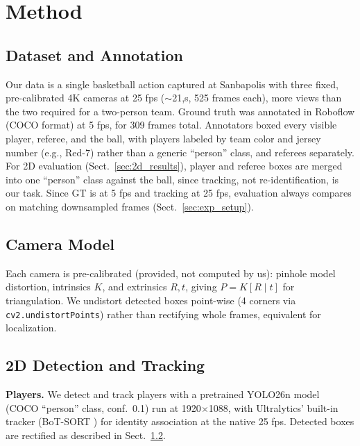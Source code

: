 \documentclass[runningheads]{llncs}
\begin{document}
\section{Method}
\label{sec:method}

\subsection{Dataset and Annotation}
\label{sec:dataset}

Our data is a single basketball action captured at Sanbapolis with three fixed, pre-calibrated 4K cameras at 25 fps ($\sim$21,s, 525 frames each), more views than the two required for a two-person team. Ground truth was annotated in Roboflow (COCO format) at 5 fps, for 309 frames total. Annotators boxed every visible player, referee, and the ball, with players labeled by team color and jersey number (e.g., Red-7) rather than a generic ``person'' class, and referees separately. For 2D evaluation (Sect.~\ref{sec:2d_results}), player and referee boxes are merged into one ``person'' class against the ball, since tracking, not re-identification, is our task. Since GT is at 5 fps and tracking at 25 fps, evaluation always compares on matching downsampled frames (Sect.~\ref{sec:exp_setup}).


\subsection{Camera Model}
\label{sec:calibration}

Each camera is pre-calibrated (provided, not computed by us): pinhole model distortion, intrinsics $K$, and extrinsics $R,t$, giving $P=K[R\mid t]$ for triangulation. We undistort detected boxes point-wise (4 corners via \texttt{cv2.undistortPoints}) rather than rectifying whole frames, equivalent for localization.

\subsection{2D Detection and Tracking}
\label{sec:2d_tracking}

\textbf{Players.} We detect and track players with a pretrained YOLO26n model \cite{Jocher2023} (COCO ``person'' class, conf.\ 0.1) run at 1920$\times$1088, with Ultralytics' built-in tracker (BoT-SORT \cite{Aharon2022}) for identity association at the native 25 fps. Detected boxes are rectified as described in Sect.~\ref{sec:calibration}.
\end{document}
